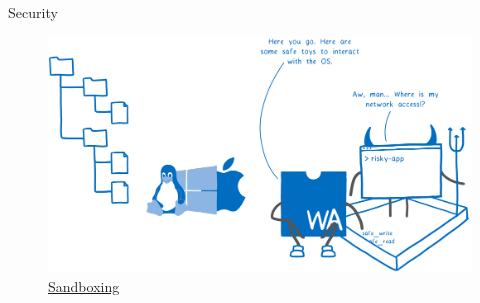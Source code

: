 \documentclass{beamer}
\begin{document}
\begin{frame}{Security}
     \begin{figure}
        \includegraphics[scale=0.07]{./images/sandbox.png}
        \caption{\href{https://hacks.mozilla.org/2019/03/standardizing-wasi-a-webassembly-system-interface/}{Sandboxing}}
    \end{figure}
\end{frame}
 
\end{document}

